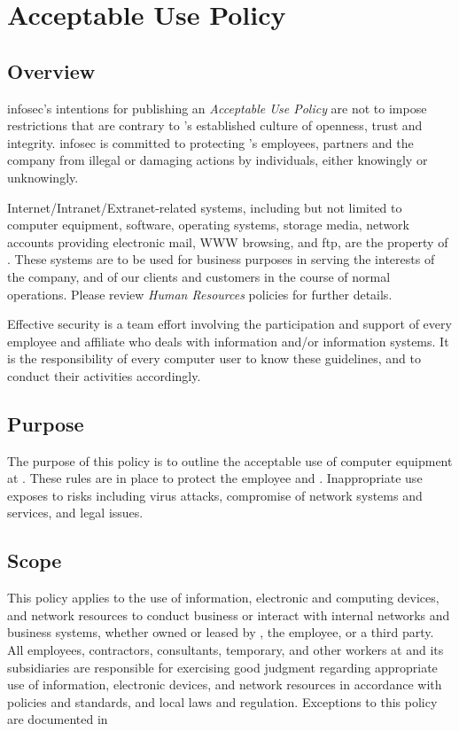 \chapter{Acceptable Use Policy}
\CommonIntroduction

\section{Overview}
\gls{infosec}'s intentions for publishing an \textsl{Acceptable Use Policy} are not to impose restrictions that are contrary to \CompanyName{}'s established culture of openness, trust and integrity.  
\gls{infosec} is committed to protecting \CompanyName{}'s employees, partners and the company from illegal or damaging actions by individuals, either knowingly or unknowingly.  

Internet/Intranet/Extranet-related systems, including but not limited to computer equipment, software, operating systems, storage media, network accounts providing electronic mail, WWW browsing, and \gls{ftp}, are the property of \CompanyName{}.  
These systems are to be used for business purposes in serving the interests of the company, and of our clients and customers in the course of normal operations.  
Please review \textsl{Human Resources} policies for further details.

Effective security is a team effort involving the participation and support of every \CompanyName{} employee and affiliate who deals with information and/or information systems. It is the responsibility of every computer user to know these guidelines, and to conduct their activities accordingly.

\section{Purpose}
The purpose of this policy is to outline the acceptable use of computer equipment at \CompanyName{}.  
These rules are in place to protect the employee and \CompanyName{}.  
Inappropriate use exposes \CompanyName{} to risks including virus attacks, compromise of network systems and services, and legal issues.  

\section{Scope}
This policy applies to the use of information, electronic and computing devices, and network resources to conduct \CompanyName{} business or interact with internal networks and business systems, whether owned or leased by \CompanyName{}, the employee, or a third party.  
All employees, contractors, consultants, temporary, and other workers at \CompanyName{} and its subsidiaries are responsible for exercising good judgment regarding appropriate use of information, electronic devices, and network resources in accordance with \CompanyName{} policies and standards, and local laws and regulation.
Exceptions to this policy are documented in %

